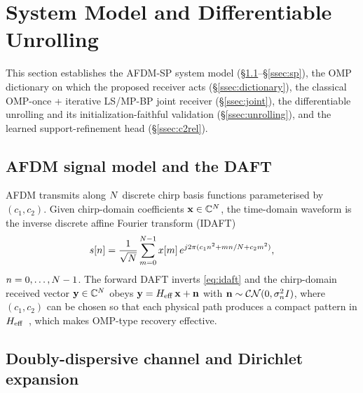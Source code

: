 \section{System Model and Differentiable Unrolling}
\label{sec:method}

This section establishes the AFDM-SP system model
(\S\ref{ssec:daft}--\S\ref{ssec:sp}), the OMP dictionary on which the
proposed receiver acts (\S\ref{ssec:dictionary}), the classical OMP-once
+ iterative LS/MP-BP joint receiver (\S\ref{ssec:joint}), the
differentiable unrolling and its initialization-faithful validation
(\S\ref{ssec:unrolling}), and the learned support-refinement head
(\S\ref{ssec:c2rel}).

\subsection{AFDM signal model and the DAFT}
\label{ssec:daft}

AFDM transmits along $N$ discrete chirp basis functions parameterised
by $(c_1,c_2)$. Given chirp-domain coefficients $\mathbf{x}\in\mathbb{C}^{N}$, the
time-domain waveform is the inverse discrete affine Fourier transform
(IDAFT)
\begin{equation}
s[n] = \frac{1}{\sqrt{N}}\sum_{m=0}^{N-1} x[m]\,
       e^{j2\pi(c_1 n^2 + mn/N + c_2 m^2)},
\label{eq:idaft}
\end{equation}
$n=0,\dots,N-1$. The forward DAFT inverts \eqref{eq:idaft} and the
chirp-domain received vector $\mathbf{y}\in\mathbb{C}^{N}$ obeys
$\mathbf{y} = H_{\mathrm{eff}}\,\mathbf{x} + \mathbf{n}$ with $\mathbf{n}\sim\mathcal{CN}(0,\sigma_n^2 I)$,
where $(c_1,c_2)$ can be chosen so that each physical path produces a
compact pattern in $H_{\mathrm{eff}}$~\cite{bemani2023afdm}, which makes
OMP-type recovery effective.

\subsection{Doubly-dispersive channel and Dirichlet expansion}
\label{ssec:channel}


